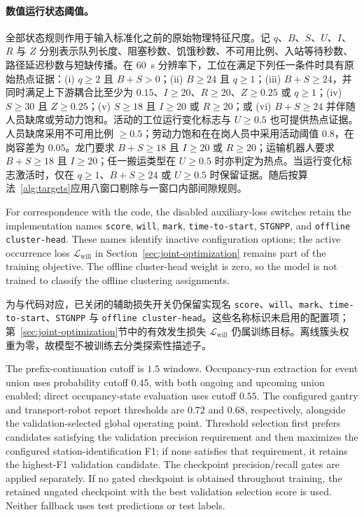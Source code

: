 \documentclass[a4paper,fleqn]{cas-dc}
\newcommand{\zhpara}[1]{%
  \par\begingroup\small\color{black!72}\noindent #1\par\endgroup}
\begin{document}
\zhpara{\paragraph{数值运行状态阈值。}
全部状态规则作用于输入标准化之前的原始物理特征尺度。记 $q$、$B$、$S$、$U$、$I$、$R$ 与 $Z$ 分别表示队列长度、阻塞秒数、饥饿秒数、不可用比例、入站等待秒数、路径延迟秒数与短缺传播。在 60~s 分辨率下，工位在满足下列任一条件时具有原始热点证据：(i) $q\geq2$ 且 $B+S>0$；(ii) $B\geq24$ 且 $q\geq1$；(iii) $B+S\geq24$，并同时满足上下游耦合比至少为 $0.15$、$I\geq20$、$R\geq20$、$Z\geq0.25$ 或 $q\geq1$；(iv) $S\geq30$ 且 $Z\geq0.25$；(v) $S\geq18$ 且 $I\geq20$ 或 $R\geq20$；或 (vi) $B+S\geq24$ 并伴随人员缺席或劳动力饱和。活动的工位运行变化标志与 $U\geq0.5$ 也可提供热点证据。人员缺席采用不可用比例 $\geq0.5$；劳动力饱和在在岗人员中采用活动阈值 $0.8$，在岗容差为 $0.05$。龙门要求 $B+S\geq18$ 且 $I\geq20$ 或 $R\geq20$；运输机器人要求 $B+S\geq18$ 且 $I\geq20$；任一搬运类型在 $U\geq0.5$ 时亦判定为热点。当运行变化标志激活时，仅在 $q\geq1$、$B+S\geq24$ 或 $U\geq0.5$ 时保留证据。随后按算法~\ref{alg:targets}应用八窗口剔除与一窗口内部间隙规则。}


For correspondence with the code, the disabled auxiliary-loss switches retain the implementation names \texttt{score}, \texttt{will}, \texttt{mark}, \texttt{time-to-start}, \texttt{STGNPP}, and \texttt{offline cluster-head}. These names identify inactive configuration options; the active occurrence loss $\mathcal{L}_{\mathrm{will}}$ in Section~\ref{sec:joint-optimization} remains part of the training objective. The offline cluster-head weight is zero, so the model is not trained to classify the offline clustering assignments.

\zhpara{为与代码对应，已关闭的辅助损失开关仍保留实现名 \texttt{score}、\texttt{will}、\texttt{mark}、\texttt{time-to-start}、\texttt{STGNPP} 与 \texttt{offline cluster-head}。这些名称标识未启用的配置项；第~\ref{sec:joint-optimization}节中的有效发生损失 $\mathcal{L}_{\mathrm{will}}$ 仍属训练目标。离线簇头权重为零，故模型不被训练去分类探索性描述子。}


The prefix-continuation cutoff is $1.5$ windows. Occupancy-run extraction for event union uses probability cutoff $0.45$, with both ongoing and upcoming union enabled; direct occupancy-state evaluation uses cutoff $0.55$. The configured gantry and transport-robot report thresholds are $0.72$ and $0.68$, respectively, alongside the validation-selected global operating point. Threshold selection first prefers candidates satisfying the validation precision requirement and then maximizes the configured station-identification F1; if none satisfies that requirement, it retains the highest-F1 validation candidate. The checkpoint precision/recall gates are applied separately. If no gated checkpoint is obtained throughout training, the retained ungated checkpoint with the best validation selection score is used. Neither fallback uses test predictions or test labels.
\end{document}
